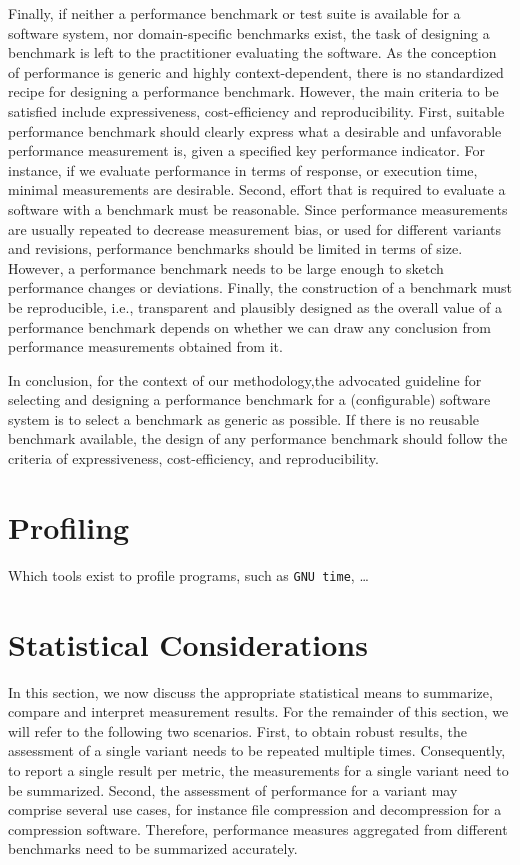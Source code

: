 Finally, if neither a performance benchmark or test suite is available for a
software system, nor domain-specific benchmarks exist, the task of designing a
benchmark is left to the practitioner evaluating the software. As the
conception of performance is generic and highly context-dependent, there is no
standardized recipe for designing a performance benchmark. However, the main
criteria to be satisfied include expressiveness, cost-efficiency and
reproducibility. First, suitable performance benchmark should clearly express
what a desirable and unfavorable performance measurement is, given a specified
key performance indicator. For instance, if we evaluate performance in terms of
response, or execution time, minimal measurements are desirable. Second, effort
that is required to evaluate a software with a benchmark must be reasonable.
Since performance measurements are usually repeated to decrease measurement
bias, or used for different variants and revisions, performance benchmarks
should be limited in terms of size. However, a performance benchmark needs to
be large enough to sketch performance changes or deviations. Finally, the
construction of a benchmark must be reproducible, i.e., transparent and
plausibly designed as the overall value of a performance benchmark depends on
whether we can draw any conclusion from performance measurements obtained from
it.

In conclusion, for the context of our methodology,the advocated guideline for
selecting and designing a performance benchmark for a (configurable) software
system is to select a benchmark as generic as possible. If there is no reusable
benchmark available, the design of any performance benchmark should follow the
criteria of expressiveness, cost-efficiency, and reproducibility.

\section{Profiling}
Which tools exist to profile programs, such as \texttt{GNU time}, \ldots


\section{Statistical Considerations}\label{sec:statistical_considerations}
In this section, we now discuss the appropriate statistical means to summarize,
compare and interpret measurement results. For the remainder of this section, we
will refer to the following two scenarios. First, to obtain robust results, the
assessment of a single variant needs to be repeated multiple times.
Consequently, to report a single result per metric, the measurements for a
single variant need to be summarized. Second, the assessment of performance for
a variant may comprise several use cases, for instance file
compression and decompression for a compression software. Therefore, performance measures
aggregated from different benchmarks need to be summarized accurately. 

